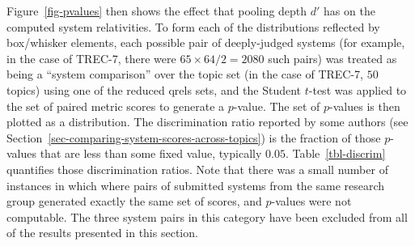 Figure~\ref{fig-pvalues} then shows the effect that pooling depth
$d'$ has on the computed system relativities.
To form each of the distributions reflected by box/whisker elements,
each possible pair of deeply-judged systems (for example, in the case
of TREC-7, there were $65\times64/2=2080$ such pairs) was treated as
being a ``system comparison'' over the topic set (in the case of
TREC-7, $50$ topics) using one of the reduced qrels sets, and the
Student $t$-test was applied to the set of paired metric scores to
generate a $p$-value.
The set of $p$-values is then plotted as a distribution.
The discrimination ratio reported by some authors (see
Section~\ref{sec-comparing-system-scores-across-topics}) is the
fraction of those $p$-values that are less than some fixed value,
typically $0.05$.
Table~\ref{tbl-discrim} quantifies those discrimination ratios.
Note that there was a small number of instances in which where pairs
of submitted systems from the same research group generated exactly
the same set of scores, and $p$-values were not computable.
The three system pairs in this category have been excluded from all
of the results presented in this section.

